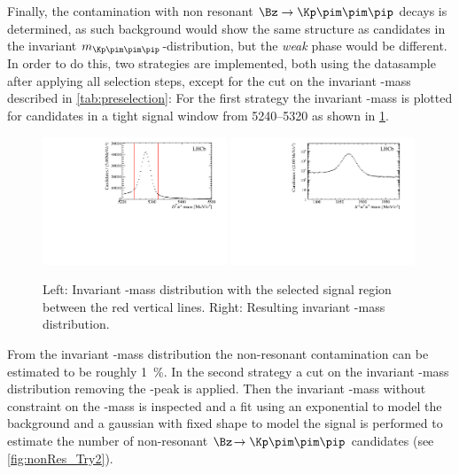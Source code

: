 Finally, the contamination with non resonant $\Bz\to\Kp\pim\pim\pip$ decays is determined, as such background would show the same structure as \BdToDpi candidates in the invariant $m_{\Kp\pim\pim\pip}$-distribution, but the \emph{weak} phase would be different.
In order to do this, two strategies are implemented, both using the datasample after applying all selection steps, except for the cut on the invariant \Dm-mass described in \cref{tab:preselection}:
For the first strategy the invariant \Dm-mass is plotted for candidates in a tight \Bz signal window from \SIrange[per-mode=symbol]{5240}{5320}{\MeVcc} as shown in \cref{fig:nonRes_Try1}.
\begin{figure}[tbp]
    \centering
    \includegraphics[width=0.49\textwidth]{06selection/figs/BmassCut.pdf}
    \includegraphics[width=0.49\textwidth]{06selection/figs/Resulting_Dmass.pdf}
    \caption{Left: Invariant \Bz-mass distribution with the selected signal region between the red vertical lines.
    Right: Resulting invariant \Dm-mass distribution.}
    \label{fig:nonRes_Try1}
\end{figure}
From the invariant \Dm-mass distribution the non-resonant contamination can be estimated to be roughly \SI{1}{\percent}.
In the second strategy a cut on the invariant \Dm-mass distribution removing the \Dm-peak is applied.
Then the invariant \Bz-mass without constraint on the \Dm-mass is inspected and a fit using an exponential to model the background and a gaussian with fixed shape to model the signal is performed to estimate the number of non-resonant $\Bz\!\to\Kp\pim\pim\pip$ candidates (see \cref{fig:nonRes_Try2}).
